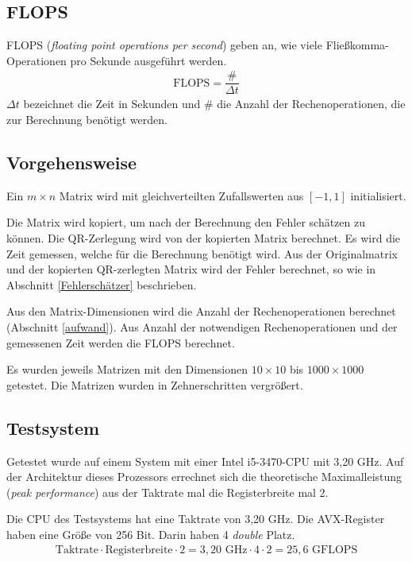 \subsection{FLOPS}
FLOPS (\textit{floating point operations per second}) geben an, wie viele Fließkomma-Operationen pro Sekunde ausgeführt werden.
\begin{align*}
  \text{FLOPS} = \dfrac{\#}{\Delta t}
\end{align*}
$\Delta t$ bezeichnet die Zeit in Sekunden und $\#$ die Anzahl der Rechenoperationen, die zur Berechnung benötigt werden.

\subsection{Vorgehensweise}

Ein $m \times n$ Matrix wird mit gleichverteilten Zufallswerten aus $[-1,1]$ initialisiert.

Die Matrix wird kopiert, um nach der Berechnung den Fehler schätzen zu können. Die QR-Zerlegung wird von der kopierten Matrix berechnet. Es wird die Zeit gemessen, welche für die Berechnung benötigt wird. 
Aus der Originalmatrix und der kopierten QR-zerlegten Matrix wird der Fehler berechnet, so wie in Abschnitt \ref{Fehlerschätzer} beschrieben.

Aus den Matrix-Dimensionen wird die Anzahl der Rechenoperationen berechnet (Abschnitt \ref{aufwand}).
Aus Anzahl der notwendigen Rechenoperationen und der gemessenen Zeit werden die FLOPS berechnet.

Es wurden jeweils Matrizen mit den Dimensionen $10 \times 10$ bis $1000 \times 1000$  getestet. Die Matrizen wurden in Zehnerschritten vergrößert.


\subsection{Testsystem}

Getestet wurde auf einem System mit einer Intel i5-3470-CPU mit 3,20 GHz. 
Auf der Architektur dieses Prozessors errechnet sich die theoretische Maximalleistung (\textit{peak performance}) aus der Taktrate mal die Registerbreite mal 2. 


Die CPU des Testsystems hat eine Taktrate von 3,20 GHz.
Die AVX-Register haben eine Größe von 256 Bit.
Darin haben 4 \textit{double} Platz.
\begin{align*}
  \text{Taktrate} \cdot \text{Registerbreite} \cdot 2= 3,20 \text{ GHz} \cdot 4 \cdot 2 = 25,6 \text{ GFLOPS}
\end{align*}

